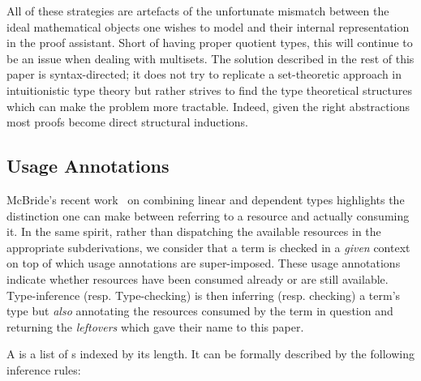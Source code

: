 All of these strategies are artefacts of the unfortunate mismatch
between the ideal mathematical objects one wishes to model and
their internal representation in the proof assistant. Short of
having proper quotient types, this will continue to be an issue
when dealing with multisets. The solution described in the rest
of this paper is syntax-directed; it does not try to replicate a
set-theoretic approach in intuitionistic type theory but rather
strives to find the type theoretical structures which can make
the problem more tractable. Indeed, given the right abstractions
most proofs become direct structural inductions.

\subsection{Usage Annotations}

McBride's recent work~\cite{mcbride2016got} on combining linear and
dependent types highlights the distinction one can make between
referring to a resource and actually consuming it. In the same spirit,
rather than dispatching the available resources in the appropriate
subderivations, we consider that a term is checked in a \emph{given}
context on top of which usage annotations are super-imposed. These
usage annotations indicate whether resources have been consumed already
or are still available. Type-inference (resp. Type-checking) is then
inferring (resp. checking) a term's type but \emph{also} annotating
the resources consumed by the term in question and returning the
\emph{leftovers} which gave their name to this paper.

\begin{definition}
\label{definition:context}
A \textbf{\Context{}} is a list of \Type{}s indexed by its length. It can
be formally described by the following inference rules:
\end{definition}


